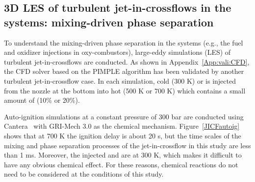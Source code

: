 \subsection{3D LES of turbulent jet-in-crossflows in the  systems: mixing-driven phase separation}
\label{sec:results:JICF}
To understand the mixing-driven phase separation in the  systems (e.g., the fuel and oxidizer injections in  oxy-combustors), large-eddy simulations (LES) of turbulent jet-in-crossflows are conducted. As shown in Appendix~\ref{App:vali:CFD}, the CFD solver based on the PIMPLE algorithm has been validated by another turbulent jet-in-crossflow case. %
In each simulation, cold (300 K)  or  is injected from the nozzle at the bottom into hot (500 K or 700 K)  which contains a small amount of  (10\% or 20\%). %

Auto-ignition simulations at a constant pressure of 300 bar are conducted using Cantera~\cite{goodwin2009cantera} with GRI-Mech 3.0 \cite{smith1999gri} as the chemical mechanism. Figure~\ref{JICFautoig} shows that at 700 K the ignition delay is about 20 s, but the time scales of the mixing and phase separation processes of the jet-in-crossflow in this study are less than 1 ms. Moreover, the injected  and  are at 300 K, which makes it difficult to have any obvious chemical effect. For these reasons, chemical reactions do not need to be considered at the conditions of this study.


